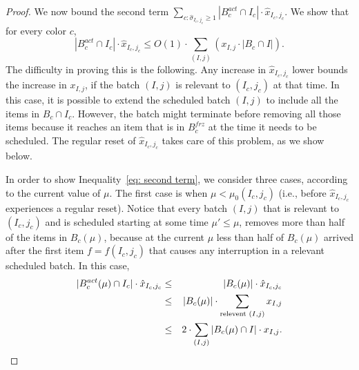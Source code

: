 \documentclass[12pt]{article}
\begin{document}
\begin{proof}
We now bound the second term
$\sum_{c: \hat{\sigma}_{I_c,j_c}\ge 1}|B_c^{act}\cap I_c|\cdot \hat{x}_{I_c,j_c}$.
We show that for every color $c$,
\begin{equation}\label{eq: second term}
|B_c^{act}\cap I_c|\cdot \hat{x}_{I_c,j_c}\le 
O(1)\cdot\sum_{(I,j)} \left(x_{I,j}\cdot |B_c\cap I|\right).
\end{equation}
The difficulty in proving this is the following. Any increase in
$\hat{x}_{I_c,j_c}$ lower bounds the increase in $x_{I,j}$, if
the batch $(I,j)$ is relevant to $(I_c,j_c)$ at that time. In this
case, it is possible to extend the scheduled batch $(I,j)$ to
include all the items in $B_c\cap I_c$. However, the batch
might terminate before removing all those items because it
reaches an item that is in $B_c^{frz}$ at the time it needs to
be scheduled. The regular reset of $\hat{x}_{I_c,j_c}$ takes
care of this problem, as we show below.

In order to show Inequality~\eqref{eq: second term}, we consider 
three cases, according to the current value of $\mu$. The first case 
is when $\mu < \mu_0(I_c,j_c)$ (i.e., before $\hat{x}_{I_c,j_c}$
experiences a regular reset). Notice that every batch $(I,j)$ that 
is relevant to $(I_c,j_c)$ and is scheduled starting at some time
$\mu'\le\mu$, removes more than half of the items in $B_c(\mu)$,
because at the current $\mu$ less than half of $B_c(\mu)$ arrived 
after the first item $f=f(I_c,j_c)$ that causes any interruption 
in a relevant scheduled batch. In this case,
\begin{eqnarray*}
          |B_c^{act}(\mu)\cap I_c|\cdot \hat{x}_{I_c,j_c}
&\le& |B_c(\mu)|\cdot \hat{x}_{I_c,j_c} \\
&\le& |B_c(\mu)|\cdot\sum_{\hbox{\scriptsize relevent } (I,j)} x_{I,j}\\
&\le& 2\cdot\sum_{(I,j)} |B_c(\mu)\cap I| \cdot x_{I,j}.
\end{eqnarray*}


\end{proof}
\end{document}
